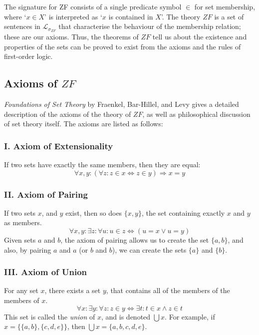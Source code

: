 \documentclass[11pt]{report}
\theoremstyle{definition}
\theoremstyle{theorem}
\theoremstyle{lemma}
\begin{document}
The signature for ZF consists of a single predicate symbol $\in$ for set membership, where `$x \in X$' is interpreted as `$x$ is contained in $X$'.
The theory $\mathit{ZF}$ is a set of sentences in $\mathcal{L}_{\sigma_{\mathit{ZF}}}$ that characterise the behaviour of the membership relation; these are our axioms.
Thus, the theorems of $\mathit{ZF}$ tell us about the existence and properties of the sets can be proved to exist from the axioms and the rules of first-order logic.\\

\subsection{Axioms of $\mathit{ZF}$}
\textit{Foundations of Set Theory} by Fraenkel, Bar-Hillel, and Levy \cite{foundations} gives a detailed description of the axioms of the theory of $\mathit{ZF}$, as well as philosophical discussion of set theory itself.
The axioms are listed as follows:

\subsubsection*{I. Axiom of Extensionality}
If two sets have exactly the same members, then they are equal:
$$\forall x,y:(\forall z: z\in x \Leftrightarrow z\in y) \Rightarrow x=y$$

\subsubsection*{II. Axiom of Pairing}
If two sets $x$, and $y$ exist, then so does $\{x,y\}$, the set containing exactly $x$ and $y$ as members.
$$\forall x,y: \exists z: \forall u: u\in z \Leftrightarrow (u=x \vee u=y)$$
Given sets $a$ and $b$, the axiom of pairing allows us to create the set $\{a,b\}$, and also, by pairing $a$ and $a$ (or $b$ and $b$), we can create the sets $\{a\}$ and $\{b\}$.

\subsubsection*{III. Axiom of Union}
For any set $x$, there exists a set $y$, that contains all of the members of the members of $x$.
$$\forall x: \exists y: \forall z: z\in y \Leftrightarrow \exists t: t\in x \wedge z\in t$$
This set is called the \emph{union} of $x$, and is denoted $\bigcup x$.
For example, if $x = \{\{a,b\}, \{c,d,e\}\}$, then $\bigcup x = \{a,b,c,d,e\}$.
\end{document}

